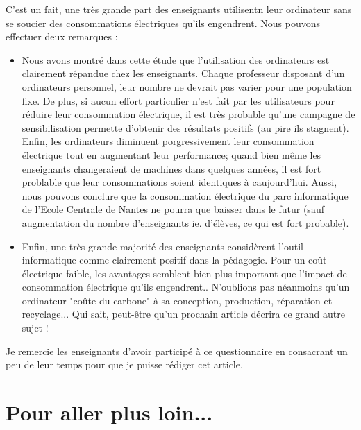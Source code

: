 \documentclass[a4paper,11pt,french]{article}
\begin{document}
C'est un fait, une très grande part des enseignants utilisentn leur ordinateur sans se soucier des consommations électriques qu'ils engendrent. Nous pouvons effectuer deux remarques :\\
\begin{itemize}
\item Nous avons montré dans cette étude que l'utilisation des ordinateurs est clairement répandue chez les enseignants. Chaque professeur disposant d'un ordinateurs personnel, leur nombre ne devrait pas varier pour une population fixe. De plus, si aucun effort particulier n'est fait par les utilisateurs pour réduire leur consommation électrique, il est très probable qu'une campagne de sensibilisation permette d'obtenir des résultats positifs (au pire ils stagnent). Enfin, les ordinateurs diminuent porgressivement leur consommation électrique tout en augmentant leur performance; quand bien même les enseignants changeraient de machines dans quelques années, il est fort problable que leur consommations soient identiques à caujourd'hui. Aussi, nous pouvons conclure que la consommation électrique du parc informatique de l'Ecole Centrale de Nantes ne pourra que baisser dans le futur (sauf augmentation du nombre d'enseignants ie. d'élèves, ce qui est fort probable).
\item Enfin, une très grande majorité des enseignants considèrent l'outil informatique comme clairement positif dans la pédagogie. Pour un coût électrique faible, les avantages semblent bien plus important que l'impact de consommation électrique qu'ils engendrent.. N'oublions pas néanmoins qu'un ordinateur "coûte du carbone" à sa conception, production, réparation et recyclage... Qui sait, peut-être qu'un prochain article décrira ce grand autre sujet !
\end{itemize}

Je remercie les enseignants d'avoir participé à ce questionnaire en consacrant un peu de leur temps pour que je puisse rédiger cet article.


\newpage
\part{Pour aller plus loin...}
\end{document}
